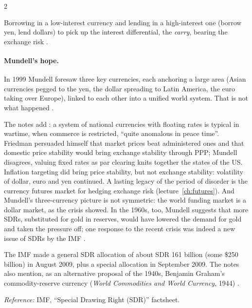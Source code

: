 \begin{paracol}{2}
\begin{definition}
Borrowing in a low-interest currency and lending in a high-interest one (borrow yen, lend dollars) to pick up the interest differential, the \emph{carry},
bearing the exchange risk .
\end{definition}

\paragraph{Mundell's hope.} In 1999 Mundell foresaw three key currencies, each anchoring a large area (Asian currencies pegged to the yen, the dollar spreading
to Latin America, the euro taking over Europe), linked to each other into a unified world system. That is not what happened .

The notes add : a system of national currencies with floating rates is typical in wartime, when commerce is restricted, ``quite anomalous in peace time''. Friedman persuaded
himself that market prices beat administered ones and that domestic price stability would bring exchange stability through PPP; Mundell disagrees, valuing fixed rates as par clearing knits
together the states of the US. Inflation targeting did bring price stability, but not exchange stability: volatility of dollar, euro and yen continued. A lasting legacy of the period of disorder is
the currency futures market for hedging exchange risk (lecture~\ref{ch:futures}). And Mundell's three-currency picture is not symmetric: the world funding market is a dollar market, as the crisis showed.
In the 1960s, too, Mundell suggests that more SDRs, substituted for gold in reserves, would have lowered the demand for gold and taken the pressure off; one response to the recent crisis was indeed
a new issue of SDRs by the IMF .

\begin{coursenote}
The IMF made a general SDR allocation of about SDR 161 billion (some \$250 billion) in August 2009, plus a special allocation in September 2009. The notes also mention, as an alternative
proposal of the 1940s, Benjamin Graham's commodity-reserve currency (\emph{World Commodities and World Currency}, 1944) .\par
\emph{Reference:} IMF, ``Special Drawing Right (SDR)'' factsheet.
\end{coursenote}


\end{paracol}
